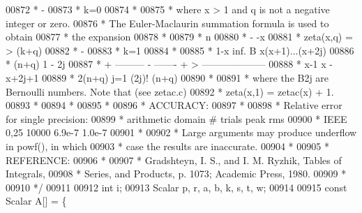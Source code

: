 \begin{DoxyCode}
00872 \textcolor{comment}{         *                  -}
00873 \textcolor{comment}{         *                 k=0}
00874 \textcolor{comment}{         *}
00875 \textcolor{comment}{         * where x > 1 and q is not a negative integer or zero.}
00876 \textcolor{comment}{         * The Euler-Maclaurin summation formula is used to obtain}
00877 \textcolor{comment}{         * the expansion}
00878 \textcolor{comment}{         *}
00879 \textcolor{comment}{         *                n}
00880 \textcolor{comment}{         *                -       -x}
00881 \textcolor{comment}{         * zeta(x,q)  =   >  (k+q)}
00882 \textcolor{comment}{         *                -}
00883 \textcolor{comment}{         *               k=1}
00884 \textcolor{comment}{         *}
00885 \textcolor{comment}{         *           1-x                 inf.  B   x(x+1)...(x+2j)}
00886 \textcolor{comment}{         *      (n+q)           1         -     2j}
00887 \textcolor{comment}{         *  +  ---------  -  -------  +   >    --------------------}
00888 \textcolor{comment}{         *        x-1              x      -                   x+2j+1}
00889 \textcolor{comment}{         *                   2(n+q)      j=1       (2j)! (n+q)}
00890 \textcolor{comment}{         *}
00891 \textcolor{comment}{         * where the B2j are Bernoulli numbers.  Note that (see zetac.c)}
00892 \textcolor{comment}{         * zeta(x,1) = zetac(x) + 1.}
00893 \textcolor{comment}{         *}
00894 \textcolor{comment}{         *}
00895 \textcolor{comment}{         *}
00896 \textcolor{comment}{         * ACCURACY:}
00897 \textcolor{comment}{         *}
00898 \textcolor{comment}{         * Relative error for single precision:}
00899 \textcolor{comment}{         * arithmetic   domain     # trials      peak         rms}
00900 \textcolor{comment}{         *    IEEE      0,25        10000       6.9e-7      1.0e-7}
00901 \textcolor{comment}{         *}
00902 \textcolor{comment}{         * Large arguments may produce underflow in powf(), in which}
00903 \textcolor{comment}{         * case the results are inaccurate.}
00904 \textcolor{comment}{         *}
00905 \textcolor{comment}{         * REFERENCE:}
00906 \textcolor{comment}{         *}
00907 \textcolor{comment}{         * Gradshteyn, I. S., and I. M. Ryzhik, Tables of Integrals,}
00908 \textcolor{comment}{         * Series, and Products, p. 1073; Academic Press, 1980.}
00909 \textcolor{comment}{         *}
00910 \textcolor{comment}{         */}
00911 
00912         \textcolor{keywordtype}{int} i;
00913         Scalar p, r, a, b, k, s, t, w;
00914 
00915         \textcolor{keyword}{const} Scalar A[] = \{

\end{DoxyCode}
